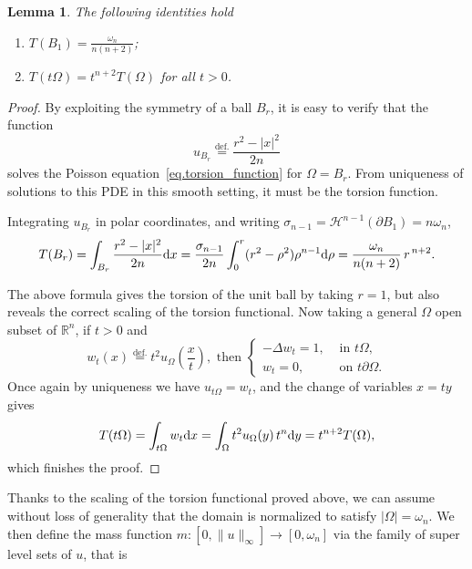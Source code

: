 \documentclass[11pt]{amsart}
\newcommand{\lemmname}{Lemma}
\theoremstyle{plain}
\newtheorem{lemma}[theorem]{\lemmname}
\theoremstyle{definition}
\newcommand{\eqdef}{\overset{\text{def.}}{=}}
\def\dd{{\rm d}}
\begin{document}
\begin{lemma}\label{lemma.torsion_scaling}
  The following identities hold
  \begin{enumerate}
    \item $T(B_1) = \displaystyle \frac{\omega_n}{n(n+2)}$;
    \item $T(t\Omega) = t^{n+2}T(\Omega)$ for all $t>0$.
  \end{enumerate}
\end{lemma}
\begin{proof}
  By exploiting the symmetry of a ball $B_r$, it is easy to verify that the function
  \[
    u_{B_r} \eqdef \frac{r^2 - |x|^2}{2n}
  \]
  solves the Poisson equation~\eqref{eq.torsion_function} for $\Omega = B_r$. From uniqueness of solutions to this PDE in this smooth setting, it must be the torsion function.

  Integrating $u_{B_r}$ in polar
  coordinates, and writing $\sigma_{n-1}=\mathcal H^{n-1}(\partial B_1)=n\omega_n$,
  \[
    T(B_r)=\int_{B_r}\frac{r^2-|x|^2}{2n}\dd x
    =\frac{\sigma_{n-1}}{2n}\int_0^r(r^2-\rho^2)\rho^{n-1}\dd \rho
    = \frac{\omega_n}{n(n+2)}\,r^{\,n+2}.
  \]

  The above formula gives the torsion of the unit ball by taking $r = 1$, but also reveals the correct scaling of the torsion functional. Now taking a general $\Omega$ open subset of $\mathbb{R}^n$, if $t>0$ and
  \[
      w_t(x)\eqdef t^2 u_\Omega\left(\frac{x}{t}\right), \text{ then }
      \begin{cases}
        - \Delta w_t = 1,& \text{ in } t \Omega,\\
        w_t = 0 ,& \text{ on } t \partial \Omega.
      \end{cases}
  \]
  Once again by uniqueness we have $u_{t\Omega}=w_t$, and the change of
  variables $x=ty$ gives
  \[
    T(t\Omega)=\int_{t\Omega}w_t\dd x=\int_\Omega t^2u_\Omega(y)\,t^n\dd y=t^{n+2}T(\Omega),
  \]
  which finishes the proof.
\end{proof}

Thanks to the scaling of the torsion functional proved above, we can assume without loss of generality that the domain is normalized to satisfy $|\Omega| = \omega_n$. We then define the mass function $m: [0, \|u\|_\infty] \to [0,\omega_n]$ via the family of super level sets of $u$, that is
\end{document}
